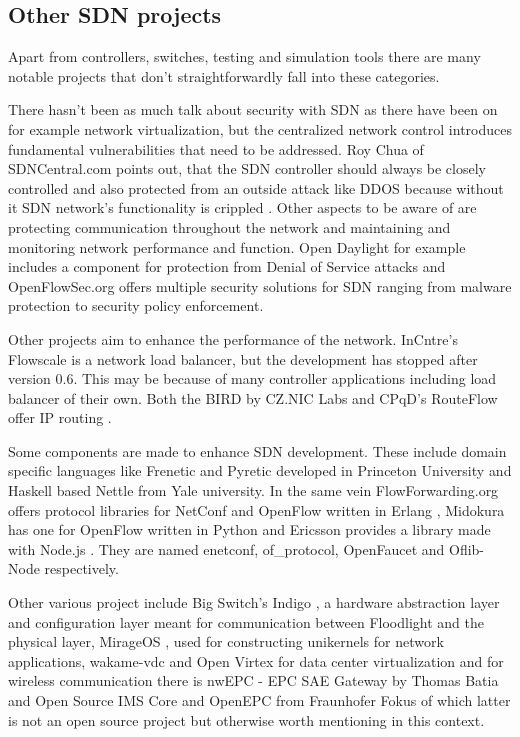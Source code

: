 \subsection{Other SDN projects}

Apart from controllers, switches, testing and simulation tools there are many notable projects that don’t straightforwardly fall into these categories.

There hasn’t been as much talk about security with SDN as there have been on for example network virtualization, but the centralized network control introduces fundamental vulnerabilities that need to be addressed. Roy Chua of SDNCentral.com points out, that the SDN controller should always be closely controlled and also protected from an outside attack like DDOS because without it SDN network's functionality is crippled \cite{CHU2} . Other aspects to be aware of are protecting communication throughout the network and maintaining and monitoring network performance and function. Open Daylight for example includes a component for protection from Denial of Service attacks and OpenFlowSec.org offers multiple security solutions for SDN ranging from malware protection to security policy enforcement.

Other projects aim to enhance the performance of the network. InCntre’s Flowscale \cite{Flowscale} is a network load balancer, but the development has stopped after version 0.6. This may be because of many controller applications including load balancer of their own. Both the BIRD by CZ.NIC Labs and CPqD’s RouteFlow offer IP routing \cite{Bird, RouteFlow}.

Some components are made to enhance SDN development. These include domain specific languages like Frenetic and Pyretic developed in Princeton University \cite{Frenetic} and Haskell based Nettle \cite{Nettle} from Yale university. In the same vein FlowForwarding.org offers protocol libraries for NetConf and OpenFlow written in Erlang \cite{enetconf,ofproto}, Midokura has one for OpenFlow written in Python \cite{OpenFaucet} and Ericsson provides a library made with Node.js \cite{Node}. They are named enetconf, of\_protocol, OpenFaucet and Oflib-Node respectively. 

Other various project include Big Switch’s Indigo \cite{Indigo}, a hardware abstraction layer and configuration layer meant for communication between Floodlight and the physical layer, MirageOS \cite{Mirage}, used for constructing unikernels for network applications, wakame-vdc and Open Virtex for data center virtualization \cite{wakame, Virtex} and for wireless communication there is nwEPC - EPC SAE Gateway by Thomas Batia \cite{nwEPC} and Open Source IMS Core and OpenEPC from Fraunhofer Fokus \cite{IMSCORE, OpenEPC} of which latter is not an open source project but otherwise worth mentioning in this context. 

